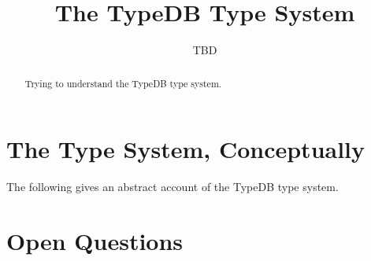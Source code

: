 \documentclass[runningheads]{llncs}
\begin{document}
\title{The TypeDB Type System}

\author{TBD
}
\maketitle

\begin{abstract}
Trying to understand the TypeDB type system.
\end{abstract}






\section{The Type System, Conceptually}

The following gives an abstract account of the TypeDB type system.




\section{Open Questions}





\end{document}
